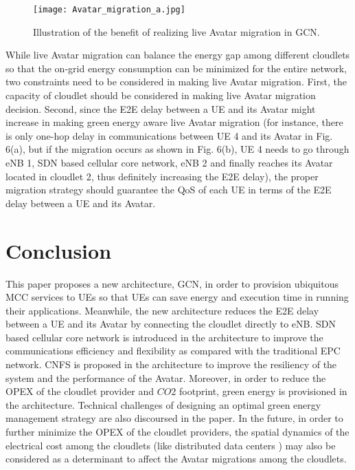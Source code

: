 \documentclass[journal,12pt,draftclsnofoot,onecolumn]{IEEEtran}
\begin{document}
\begin{figure*}[!h]
\begin{minipage}[t]{1\linewidth}
        \centering
        \texttt{[image: Avatar\_migration\_a.jpg]}
    	\caption{Illustration of the benefit of realizing live Avatar migration in GCN.}
    	\label{fig:Avatar_migration_a}
\end{minipage}
\end{figure*}

While live Avatar migration can balance the energy gap among different cloudlets so that the on-grid energy consumption can be minimized for the entire network, two constraints need to be considered in making live Avatar migration. First, the capacity of cloudlet should be considered in making live Avatar migration decision. Second, since the E2E delay between a UE and its Avatar might increase in making green energy aware live Avatar migration (for instance, there is only one-hop delay in communications between UE 4 and its Avatar in Fig. 6(a), but if the migration occurs as shown in Fig. 6(b), UE 4 needs to go through eNB 1, SDN based cellular core network, eNB 2 and finally reaches its Avatar located in cloudlet 2, thus definitely increasing the E2E delay), the proper migration strategy should guarantee the QoS of each UE in terms of the E2E delay between a UE and its Avatar.

\section{Conclusion}
This paper proposes a new architecture, GCN, in order to provision ubiquitous MCC services to UEs so that UEs can save energy and execution time in running their applications. Meanwhile, the new architecture reduces the E2E delay between a UE and its Avatar by connecting the cloudlet directly to eNB. SDN based cellular core network is introduced in the architecture to improve the communications efficiency and flexibility as compared with the traditional EPC network. CNFS is proposed in the architecture to improve the resiliency of the system and the performance of the Avatar. Moreover, in order to reduce the OPEX of the cloudlet provider and $CO2$ footprint, green energy is provisioned in the architecture. Technical challenges of designing an optimal green energy management strategy are also discoursed in the paper. In the future, in order to further minimize the OPEX of the cloudlet providers, the spatial dynamics of the electrical cost among the cloudlets (like distributed data centers \cite{14}) may also be considered as a determinant to affect the Avatar migrations among the cloudlets.
\end{document}

